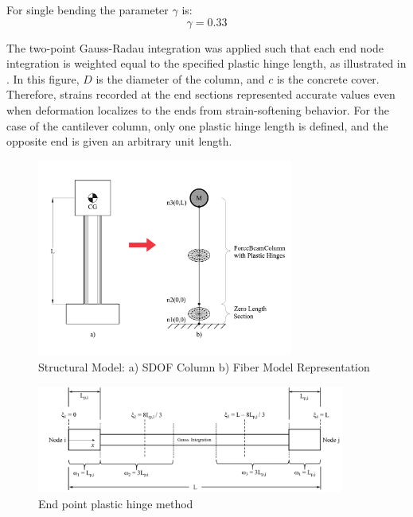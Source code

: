 For single bending the parameter $\gamma$ is:
\begin{equation}
    \gamma=0.33
    \label{eq:Gamma_LPt}
\end{equation}

The two-point Gauss-Radau integration was applied such that each end node integration is weighted equal to the specified plastic hinge length, as illustrated in . In this figure, $D$ is the diameter of the column, and $c$ is the concrete cover. Therefore, strains recorded at the end sections represented accurate values even when deformation localizes to the ends from strain-softening behavior. For the case of the cantilever column, only one plastic hinge length is defined, and the opposite end is given an arbitrary unit length. 

\begin{figure}[htbp]
	\centering
	\includegraphics[width=0.75\textwidth]{Chapter-5/figs/StructuralModel_01}
	\caption{Structural Model: a) SDOF Column b) Fiber Model Representation}
	\label{fig:Structural_Model}
\end{figure}

\begin{figure}[htbp]
	\centering
	\includegraphics[width=0.9\textwidth]{Chapter-5/figs/fbc_PlasticHinge}
	\caption{End point plastic hinge method \cite{Scott}}
	\label{fig:Fiber_PlasticHinge}
\end{figure}

